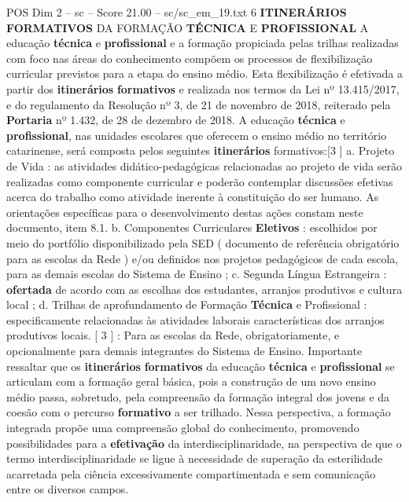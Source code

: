 \begin{textsample}{POS Dim 2 – sc – Score 21.00 – sc/sc\_em\_19.txt}  \label{ex:f2_pos_014}
6 \textbf{ITINERÁRIOS} \textbf{FORMATIVOS} DA FORMAÇÃO \textbf{TÉCNICA} E \textbf{PROFISSIONAL} A educação \textbf{técnica} e \textbf{profissional} e a formação propiciada pelas trilhas realizadas com foco nas áreas do conhecimento compõem os processos de flexibilização curricular previstos para a etapa do ensino médio.
Esta flexibilização é efetivada a partir dos \textbf{itinerários} \textbf{formativos} e realizada nos termos da Lei nº 13.415/2017, e do regulamento da Resolução nº 3, de 21 de novembro de 2018, reiterado pela \textbf{Portaria} nº 1.432, de 28 de dezembro de 2018.
A educação \textbf{técnica} e \textbf{profissional}, nas unidades escolares que oferecem o ensino médio no território catarinense, será composta pelos seguintes \textbf{itinerários} formativos:[3 ] a.
Projeto de Vida : as atividades didático-pedagógicas relacionadas ao projeto de vida serão realizadas como componente curricular e poderão contemplar discussões efetivas acerca do trabalho como atividade inerente à constituição do ser humano.
As orientações específicas para o desenvolvimento destas ações constam neste documento, item 8.1. b.
Componentes Curriculares \textbf{Eletivos} : escolhidos por meio do portfólio disponibilizado pela SED ( documento de referência obrigatório para as escolas da Rede ) e/ou definidos nos projetos pedagógicos de cada escola, para as demais escolas do Sistema de Ensino ; c.
Segunda Língua Estrangeira : \textbf{ofertada} de acordo com as escolhas dos estudantes, arranjos produtivos e cultura local ; d.
Trilhas de aprofundamento de Formação \textbf{Técnica} e Profissional : especificamente relacionadas às atividades laborais características dos arranjos produtivos locais. [ 3 ] : Para as escolas da Rede, obrigatoriamente, e opcionalmente para demais integrantes do Sistema de Ensino.
Importante ressaltar que os \textbf{itinerários} \textbf{formativos} da educação \textbf{técnica} e \textbf{profissional} se articulam com a formação geral básica, pois a construção de um novo ensino médio passa, sobretudo, pela compreensão da formação integral dos jovens e da coesão com o percurso \textbf{formativo} a ser trilhado.
Nessa perspectiva, a formação integrada propõe uma compreensão global do conhecimento, promovendo possibilidades para a \textbf{efetivação} da interdisciplinaridade, na perspectiva de que o termo interdisciplinaridade se ligue à necessidade de superação da esterilidade acarretada pela ciência excessivamente compartimentada e sem comunicação entre os diversos campos.

\end{textsample}
